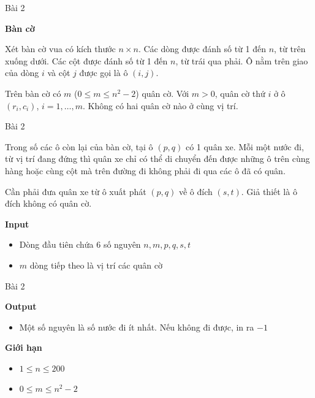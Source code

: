 \begin{frame}{Bài 2}
\begin{center}
\textbf{Bàn cờ}
\end{center}
{\small
Xét bàn cờ vua có kích thước $n \times n$. Các dòng được đánh số từ 1 đến $n$, từ trên xuống dưới. Các cột được đánh số từ 1 đến $n$, từ trái qua phải. Ô nằm trên giao của dòng $i$ và cột $j$ được gọi là ô $(i, j)$.

Trên bàn cờ có $m$ ($0 \le m \le n^2 - 2$) quân cờ. Với $m > 0$, quân cờ thứ $i$ ở ô $(r_i, c_i)$, $i = 1, \dots, m$. Không có hai quân cờ nào ở cùng vị trí.
}

\end{frame}
\begin{frame}{Bài 2}

{\small
Trong số các ô còn lại của bàn cờ, tại ô $(p, q)$ có 1 quân xe. Mỗi một nước đi, từ vị trí đang đứng thì quân xe chỉ có thể di chuyển đến được những ô trên cùng hàng hoặc cùng cột mà trên đường đi không phải đi qua các ô đã có quân.

Cần phải đưa quân xe từ ô xuất phát $(p, q)$ về ô đích $(s, t)$. Giả thiết là ô đích không có quân cờ.
}

\vspace{0.4cm}

\textbf{Input}
\begin{itemize}
\item Dòng đầu tiên chứa 6 số nguyên $n, m, p, q, s, t$
\item $m$ dòng tiếp theo là vị trí các quân cờ
\end{itemize}

\end{frame}
\begin{frame}{Bài 2}

\textbf{Output}
\begin{itemize}
\item Một số nguyên là số nước đi ít nhất. Nếu không đi được, in ra $-1$
\end{itemize}

\vspace{0.3cm}

\textbf{Giới hạn}
\begin{itemize}
\item $1 \le n \le 200$
\item $0 \le m \le n^2 - 2$
\end{itemize}

\end{frame}
